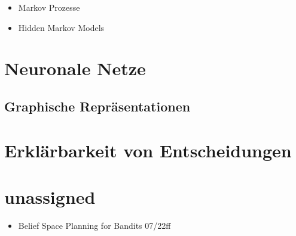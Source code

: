 \documentclass[ngerman]{../LaTeX-Templates/Paper/paper}
\begin{document}
\begin{itemize}
	\item Markov Prozesse
	\item Hidden Markov Models
\end{itemize}


\section{Neuronale Netze}
\subsection{Graphische Repräsentationen}


\section{Erklärbarkeit von Entscheidungen}







\section{unassigned}
\begin{itemize}
	\item Belief Space Planning for Bandits 07/22ff
\end{itemize}
\end{document}
